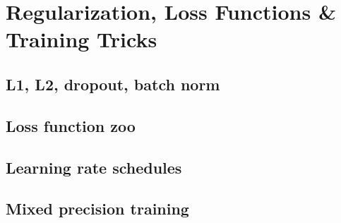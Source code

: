 
\section{Regularization, Loss Functions \& Training Tricks}

\subsection{L1, L2, dropout, batch norm}


\subsection{Loss function zoo}


\subsection{Learning rate schedules}


\subsection{Mixed precision training}



